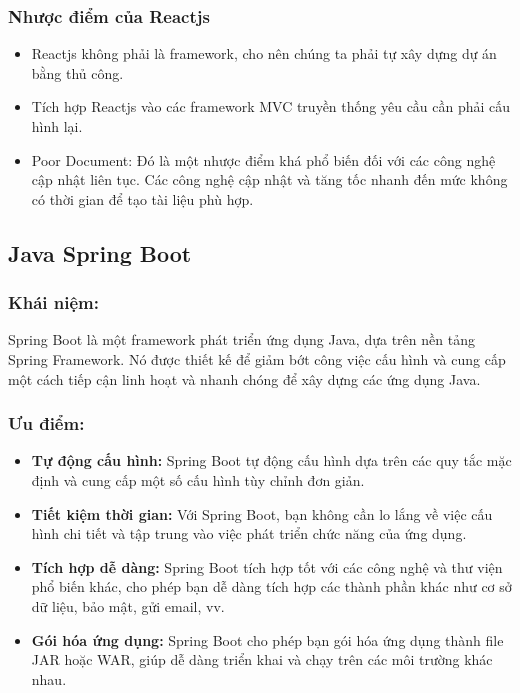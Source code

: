 \subsubsection{Nhược điểm của Reactjs}
\begin{itemize}
    \item Reactjs không phải là framework, cho nên chúng ta phải tự xây dựng dự án bằng thủ công.
    \item Tích hợp Reactjs vào các framework MVC truyền thống yêu cầu cần phải cấu hình lại.
    \item Poor Document: Đó là một nhược điểm khá phổ biến đối với các công nghệ cập nhật liên tục. Các công nghệ cập nhật và tăng tốc nhanh đến mức không có thời gian để tạo tài liệu phù hợp.
\end{itemize}
\subsection{Java Spring Boot}

\subsubsection{Khái niệm:} Spring Boot là một framework phát triển ứng dụng Java, dựa trên nền tảng Spring Framework. Nó được thiết kế để giảm bớt công việc cấu hình và cung cấp một cách tiếp cận linh hoạt và nhanh chóng để xây dựng các ứng dụng Java.

\subsubsection{Ưu điểm:}
\begin{itemize}
    \item \textbf{Tự động cấu hình:} Spring Boot tự động cấu hình dựa trên các quy tắc mặc định và cung cấp một số cấu hình tùy chỉnh đơn giản.
    \item \textbf{Tiết kiệm thời gian:} Với Spring Boot, bạn không cần lo lắng về việc cấu hình chi tiết và tập trung vào việc phát triển chức năng của ứng dụng.
    \item \textbf{Tích hợp dễ dàng:} Spring Boot tích hợp tốt với các công nghệ và thư viện phổ biến khác, cho phép bạn dễ dàng tích hợp các thành phần khác như cơ sở dữ liệu, bảo mật, gửi email, vv.
    \item \textbf{Gói hóa ứng dụng:} Spring Boot cho phép bạn gói hóa ứng dụng thành file JAR hoặc WAR, giúp dễ dàng triển khai và chạy trên các môi trường khác nhau.
\end{itemize}

